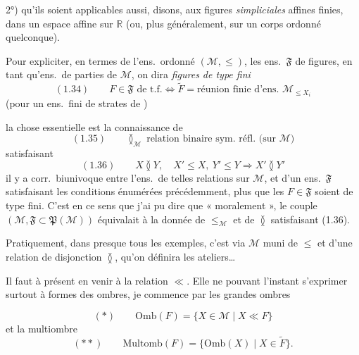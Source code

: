 \documentclass[11pt,a4paper]{article}
\begin{document}
2°) qu'ils soient applicables aussi, disons, aux figures \emph{simpliciales} affines finies, dans un espace affine sur $\mathbb{R}$ (ou, plus généralement, sur un corps ordonné quelconque).

Pour expliciter, en termes de l'ens.\ ordonné $(\mathcal{M}, \leq)$, les ens.\ $\mathfrak{F}$ de figures, en tant qu'ens.\ de parties de $\mathcal{M}$,  on dira \emph{figures de type fini}
\[
  (1.34) \qquad F \in \mathfrak{F} \text{ de t.f.} \iff \widetilde{F} = \text{réunion finie d'ens.\ } \mathcal{M}_{\leq X_i}
\]
(pour un ens.\ fini de strates de )

la chose essentielle est la connaissance de
\[
  (1.35) \qquad \mathbin{\between_{\mathcal{M}}} \ \text{relation binaire sym.\ réfl.\ (sur } \mathcal{M})
\]
 satisfaisant
\[
  (1.36) \qquad X \between Y,\quad X' \leq X,\ Y' \leq Y \Longrightarrow X' \between Y'
\]
 il y a corr.\ biunivoque entre l'ens.\ de telles relations sur $\mathcal{M}$, et d'un ens.\ $\mathfrak{F}$  satisfaisant les conditions énumérées précédemment, plus  que les $F \in \mathfrak{F}$ soient \struck{\ill{}} de type fini. C'est en ce sens que j'ai pu dire que « moralement », le couple $(\mathcal{M}, \mathfrak{F} \subset \mathfrak{P}(\mathcal{M}))$ équivalait à \struck{\ill{}} la donnée de $\leq_{\mathcal{M}}$ et de $\between$ satisfaisant (1.36).

Pratiquement, dans presque tous les exemples, c'est via $\mathcal{M}$  muni de $\leq$ et d'une relation de disjonction $\between$, qu'on définira les ateliers…

Il faut à présent en venir à la relation $\ll$.  Elle ne pouvant l'instant s'exprimer surtout à formes des ombres, je commence par les grandes ombres

\[
  (*) \qquad \mathrm{Omb}(F) = \lbrace X \in \mathcal{M} \mid X \ll F \rbrace
\]
et la multiombre
\[
  (**) \qquad \mathrm{Multomb}(F) = \lbrace \mathrm{Omb}(X) \mid X \in \widetilde{F} \rbrace .
\]
\end{document}
